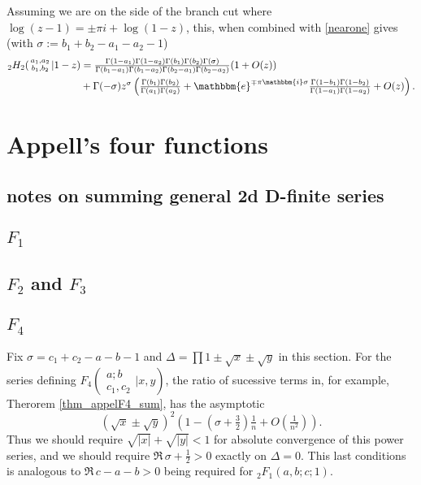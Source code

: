 \documentclass[12pt]{article}
\newcommand{\ee}[0] {\mathbbm{e}}
\newcommand{\ii}[0] {\mathbbm{i}}
\numberwithin{equation}{section}
\newcommand{\Head}[3] {{}_{#1}{#2}_{#3}}
\newcommand{\ArgS}[3] {( \begin{smallmatrix} #1 \\ #2 \end{smallmatrix} | {#3})}
\newcommand{\appellFfourS}[6]    {F_4 \ArgS{{#1};{#2}}{{#3},{#4}}{{#5},{#6}}}
\begin{document}
Assuming we are on the side of the branch cut where $\log(z-1) = \pm \pi i + \log(1-z)$, this, when combined with \eqref{nearone} gives (with $\sigma := b_1+b_2-a_1-a_2-1$)
\begin{align*}
\Head2H2 \ArgS{a_1,a_2}{b_1,b_2}{1-z} &= \tfrac{\Gamma(1-a_1)\Gamma(1-a_2)\Gamma(b_1)\Gamma(b_2)\Gamma(\sigma)}{\Gamma(b_1-a_1)\Gamma(b_1-a_2)\Gamma(b_2-a_1)\Gamma(b_2-a_2)}(1 + O(z))\\
&+ \Gamma(-\sigma) z^{\sigma} \left(\tfrac{\Gamma(b_1)\Gamma(b_2)}{\Gamma(a_1)\Gamma(a_2)} + \ee^{\mp \pi \ii \sigma} \tfrac{\Gamma(1-b_1)\Gamma(1-b_2)}{\Gamma(1-a_1)\Gamma(1-a_2)} + O(z)\right)\text{.}
\end{align*}



\section{Appell's four functions}
\subsection{notes on summing general 2d D-finite series}
\subsection{$F_1$}
\subsection{$F_2$ and $F_3$}
\subsection{$F_4$}
Fix $\sigma = c_1+c_2-a-b-1$ and $\Delta = \prod 1 \pm \sqrt{x} \pm \sqrt{y}$ in this section.
For the series defining $\appellFfourS{a}{b}{c_1}{c_2}{x}{y}$, the ratio of sucessive terms in, for example, Therorem \ref{thm_appelF4_sum}, has the asymptotic
\begin{equation*}
(\sqrt{x} \pm \sqrt{y})^2 (1 - (\sigma+\tfrac32) \tfrac{1}{n} + O(\tfrac{1}{n^2}))\text{.}
\end{equation*}
Thus we should require $\sqrt{|x|} + \sqrt{|y|} < 1$ for absolute convergence of this power series, and we should require $\Re \, \sigma +\frac12 > 0$
exactly on $\Delta=0$. This last conditions is analogous to $\Re\, c-a-b > 0$ being required for $\Head2F1(a,b;c;1)$.
\end{document}
